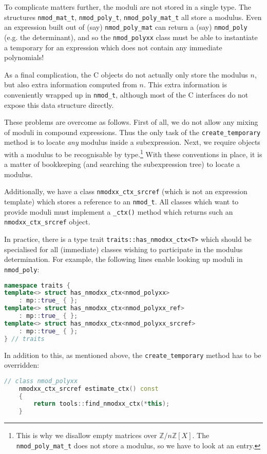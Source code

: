 \documentclass[a4paper,10pt]{book}
\newcommand{\code}{\lstinline}
\begin{document}
{{To complicate matters further, the moduli are not stored in a single type. The
structures \code{nmod_mat_t}, \code{nmod_poly_t}, \code{nmod_poly_mat_t} all
store a modulus. Even an expression built out of (say) \code{nmod_poly_mat} can
return a (say) \code{nmod_poly} (e.g. the determinant), and so the
\code{nmod_polyxx} class must be able to instantiate a temporary for an
expression which does not contain any immediate polynomials!

As a final complication, the C objects do not actually only store the modulus
$n$, but also extra information computed from $n$. This extra information is
conveniently wrapped up in \code{nmod_t}, although most of the C interfaces do
not expose this data structure directly.

These problems are overcome as follows. First of all, we do not allow any mixing
of moduli in compound expressions. Thus the only task of the
\code{create_temporary} method is to locate \emph{any} modulus inside a
subexpression. Next, we require objects with a modulus to be recognisable by
type.\footnote{This is why we disallow empty matrices over
$\mathbb{Z}/n\mathbb{Z}[X]$. The \code{nmod_poly_mat_t} does not store a
modulus, so we have to look at an entry.} With these conventions in place, it is
a matter of bookkeeping (and searching the subexpression tree) to locate a
modulus.

Additionally, we have a class \code{nmodxx_ctx_srcref} (which is not an
expression template) which stores a reference to an \code{nmod_t}. All classes
which want to provide moduli must implement a \code{_ctx()} method which returns
such an \code{nmodxx_ctx_srcref} object.

In practice, there is a type trait \code{traits::has_nmodxx_ctx<T>} which should
be specialised for all (immediate) classes wishing to participate in the modulus
determination. For example, the following lines enable looking up moduli in
\code{nmod_poly}:

\begin{lstlisting}[language=c++]
namespace traits {
template<> struct has_nmodxx_ctx<nmod_polyxx>
    : mp::true_ { };
template<> struct has_nmodxx_ctx<nmod_polyxx_ref>
    : mp::true_ { };
template<> struct has_nmodxx_ctx<nmod_polyxx_srcref>
    : mp::true_ { };
} // traits
\end{lstlisting}

In addition to this, as mentioned above, the \code{create_temporary} method has
to be overridden:

\begin{lstlisting}[language=c++]
// class nmod_polyxx
    nmodxx_ctx_srcref estimate_ctx() const
    {
        return tools::find_nmodxx_ctx(*this);
    }


\end{lstlisting}}}
\end{document}

